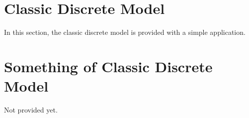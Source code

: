 \documentclass[../main.tex]{subfiles}
\begin{document}
\section{Classic Discrete Model}
In this section, the classic discrete model is provided with a simple application.

\appendix
\section{Something of Classic Discrete Model}
Not provided yet.
\end{document}
